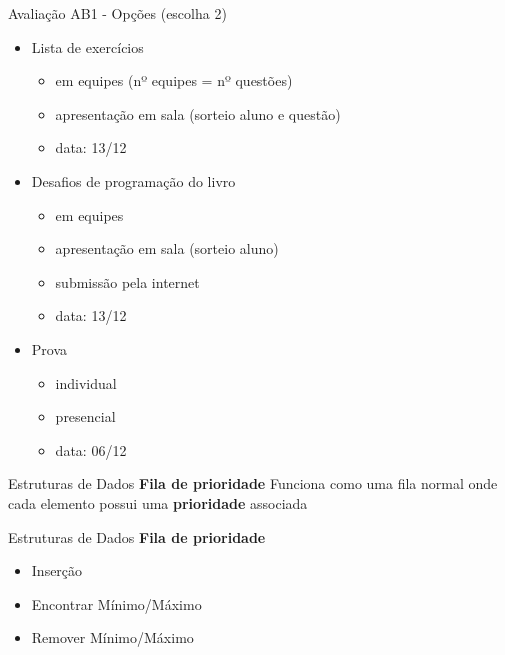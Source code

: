 \documentclass[10pt]{beamer}
\subtitle{Aula 4}
\date{22 de novembro de 2019}
\begin{document}
\maketitle

\begin{frame}{Avaliação AB1 - Opções (escolha 2)}
  \large
  \begin{itemize}
    \item Lista de exercícios

    \begin{itemize}
      \normalsize
      \item em equipes (nº equipes = nº questões)
      \item apresentação em sala (sorteio aluno e questão)
      \item data: 13/12
    \end{itemize}

    \item Desafios de programação do livro

    \begin{itemize}
      \normalsize
      \item em equipes
      \item apresentação em sala (sorteio aluno)
      \item submissão pela internet
      \item data: 13/12
    \end{itemize}

    \item Prova

    \begin{itemize}
      \normalsize
      \item individual
      \item presencial
      \item data: 06/12
    \end{itemize}
  \end{itemize}
\end{frame}

\begin{frame}{Estruturas de Dados}
  \huge
  \textbf{Fila de prioridade}
  \vfill
  \Large
  Funciona como uma fila normal onde cada elemento possui uma \textbf{prioridade} associada
\end{frame}

\begin{frame}{Estruturas de Dados}
  \huge
  \textbf{Fila de prioridade}
  \vfill
  \Large
  \begin{itemize}
    \item Inserção
    \item Encontrar Mínimo/Máximo
    \item Remover Mínimo/Máximo
  \end{itemize}
\end{frame}
\end{document}

